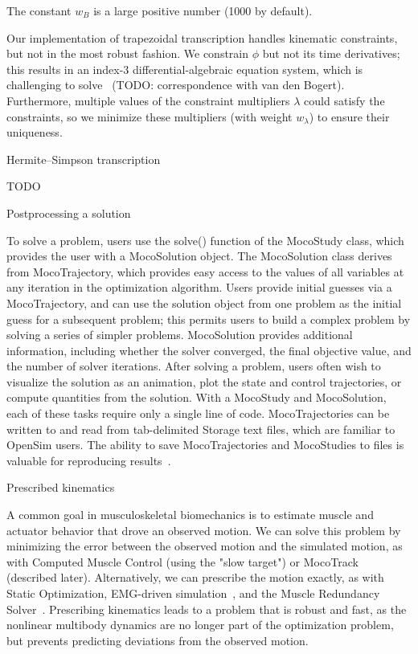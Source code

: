 \documentclass[10pt,letterpaper]{article}
\begin{document}
The constant $w_B$ is a large positive number (1000 by default).

Our implementation of trapezoidal transcription handles kinematic constraints, but not in the most robust fashion. We constrain $\phi$ but not its time derivatives; this results in an index-3 differential-algebraic equation system, which is challenging to solve~\cite{Hairer:1996} (TODO: correspondence with van den Bogert). Furthermore, multiple values of the constraint multipliers $\lambda$ could satisfy the constraints, so we minimize these multipliers (with weight $w_\lambda$) to ensure their uniqueness.


Hermite–Simpson transcription

TODO

Postprocessing a solution

To solve a problem, users use the solve() function of the MocoStudy class, which provides the user with a MocoSolution object. The MocoSolution class derives from MocoTrajectory, which provides easy access to the values of all variables at any iteration in the optimization algorithm. Users provide initial guesses via a MocoTrajectory, and can use the solution object from one problem as the initial guess for a subsequent problem; this permits users to build a complex problem by solving a series of simpler problems. MocoSolution provides additional information, including whether the solver converged, the final objective value, and the number of solver iterations. After solving a problem, users often wish to visualize the solution as an animation, plot the state and control trajectories, or compute quantities from the solution. With a MocoStudy and MocoSolution, each of these tasks require only a single line of code. MocoTrajectories can be written to and read from tab-delimited Storage text files, which are familiar to OpenSim users. The ability to save MocoTrajectories and MocoStudies to files is valuable for reproducing results~\cite{Peng:2011}.

Prescribed kinematics

A common goal in musculoskeletal biomechanics is to estimate muscle and actuator behavior that drove an observed motion. We can solve this problem by minimizing the error between the observed motion and the simulated motion, as with Computed Muscle Control (using the "slow target") or MocoTrack (described later). Alternatively, we can prescribe the motion exactly, as with Static Optimization, EMG-driven simulation~\cite{Lloyd:2003}, and the Muscle Redundancy Solver~\cite{Groote:2016dq}. Prescribing kinematics leads to a problem that is robust and fast, as the nonlinear multibody dynamics are no longer part of the optimization problem, but prevents predicting deviations from the observed motion.
\end{document}
